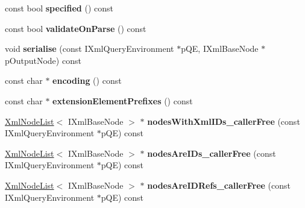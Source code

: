 \begin{DoxyCompactItemize}
\item 
\hypertarget{classgeneral__server_1_1LibXmlBaseDoc_a10159cf5a71c1d13b5f810565c932b9e}{const bool {\bfseries specified} () const }\label{classgeneral__server_1_1LibXmlBaseDoc_a10159cf5a71c1d13b5f810565c932b9e}

\item 
\hypertarget{classgeneral__server_1_1LibXmlBaseDoc_aa642f6fa8aec7210f08b10ee7b7b2440}{const bool {\bfseries validate\-On\-Parse} () const }\label{classgeneral__server_1_1LibXmlBaseDoc_aa642f6fa8aec7210f08b10ee7b7b2440}

\item 
\hypertarget{classgeneral__server_1_1LibXmlBaseDoc_a9d3b20a707771da447000baafdac1fae}{void {\bfseries serialise} (const \-I\-Xml\-Query\-Environment $\ast$p\-Q\-E, \-I\-Xml\-Base\-Node $\ast$p\-Output\-Node) const }\label{classgeneral__server_1_1LibXmlBaseDoc_a9d3b20a707771da447000baafdac1fae}

\item 
\hypertarget{classgeneral__server_1_1LibXmlBaseDoc_a55525b19f0ca52239958f3c96062db36}{const char $\ast$ {\bfseries encoding} () const }\label{classgeneral__server_1_1LibXmlBaseDoc_a55525b19f0ca52239958f3c96062db36}

\item 
\hypertarget{classgeneral__server_1_1LibXmlBaseDoc_af54bead5c6df14bd9782a7b73450627d}{const char $\ast$ {\bfseries extension\-Element\-Prefixes} () const }\label{classgeneral__server_1_1LibXmlBaseDoc_af54bead5c6df14bd9782a7b73450627d}

\item 
\hypertarget{classgeneral__server_1_1LibXmlBaseDoc_aa26dae320c7a68395d9f71b1aff07495}{\hyperlink{classgeneral__server_1_1XmlNodeList}{\-Xml\-Node\-List}$<$ \-I\-Xml\-Base\-Node $>$ $\ast$ {\bfseries nodes\-With\-Xml\-I\-Ds\-\_\-caller\-Free} (const \-I\-Xml\-Query\-Environment $\ast$p\-Q\-E) const }\label{classgeneral__server_1_1LibXmlBaseDoc_aa26dae320c7a68395d9f71b1aff07495}

\item 
\hypertarget{classgeneral__server_1_1LibXmlBaseDoc_a2140a092371a45a37d37d11eb95de429}{\hyperlink{classgeneral__server_1_1XmlNodeList}{\-Xml\-Node\-List}$<$ \-I\-Xml\-Base\-Node $>$ $\ast$ {\bfseries nodes\-Are\-I\-Ds\-\_\-caller\-Free} (const \-I\-Xml\-Query\-Environment $\ast$p\-Q\-E) const }\label{classgeneral__server_1_1LibXmlBaseDoc_a2140a092371a45a37d37d11eb95de429}

\item 
\hypertarget{classgeneral__server_1_1LibXmlBaseDoc_a27bbfd867571926cfa181e87770ffda3}{\hyperlink{classgeneral__server_1_1XmlNodeList}{\-Xml\-Node\-List}$<$ \-I\-Xml\-Base\-Node $>$ $\ast$ {\bfseries nodes\-Are\-I\-D\-Refs\-\_\-caller\-Free} (const \-I\-Xml\-Query\-Environment $\ast$p\-Q\-E) const }\label{classgeneral__server_1_1LibXmlBaseDoc_a27bbfd867571926cfa181e87770ffda3}


\end{DoxyCompactItemize}
